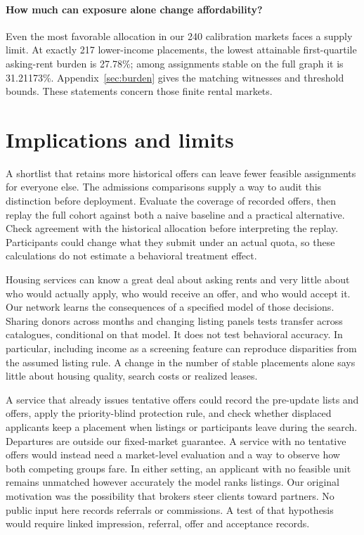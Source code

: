 \documentclass[format=acmsmall,review=false]{acmart}
\begin{document}
\paragraph{How much can exposure alone change affordability?}
Even the most favorable allocation in our 240 calibration markets faces a supply limit. At exactly 217 lower-income placements, the lowest attainable first-quartile asking-rent burden is 27.78\%; among assignments stable on the full graph it is 31.21173\%. Appendix~\ref{sec:burden} gives the matching witnesses and threshold bounds. These statements concern those finite rental markets.
\section{Implications and limits}
A shortlist that retains more historical offers can leave fewer feasible assignments for everyone else. The admissions comparisons supply a way to audit this distinction before deployment. Evaluate the coverage of recorded offers, then replay the full cohort against both a naive baseline and a practical alternative. Check agreement with the historical allocation before interpreting the replay. Participants could change what they submit under an actual quota, so these calculations do not estimate a behavioral treatment effect.

Housing services can know a great deal about asking rents and very little about who would actually apply, who would receive an offer, and who would accept it. Our network learns the consequences of a specified model of those decisions. Sharing donors across months and changing listing panels tests transfer across catalogues, conditional on that model. It does not test behavioral accuracy. In particular, including income as a screening feature can reproduce disparities from the assumed listing rule. A change in the number of stable placements alone says little about housing quality, search costs or realized leases.

A service that already issues tentative offers could record the pre-update lists and offers, apply the priority-blind protection rule, and check whether displaced applicants keep a placement when listings or participants leave during the search. Departures are outside our fixed-market guarantee. A service with no tentative offers would instead need a market-level evaluation and a way to observe how both competing groups fare. In either setting, an applicant with no feasible unit remains unmatched however accurately the model ranks listings. Our original motivation was the possibility that brokers steer clients toward partners. No public input here records referrals or commissions. A test of that hypothesis would require linked impression, referral, offer and acceptance records.
\clearpage


\clearpage
\appendix
\end{document}

